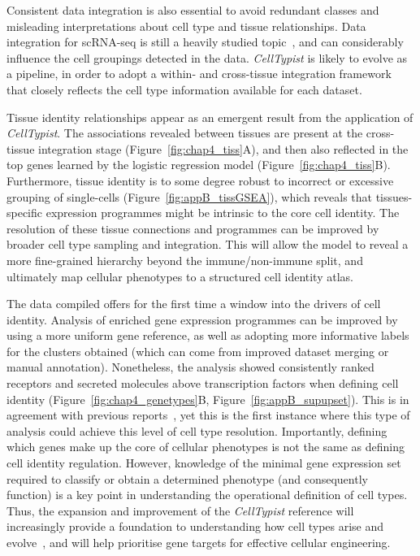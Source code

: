 Consistent data integration is also essential to avoid redundant classes and misleading interpretations about cell type and tissue relationships. Data integration for scRNA-seq is still a heavily studied topic~\citep{haghverdi_batch_2018,lopez_deep_2018,polanski_bbknn:_2019, stuart_comprehensive_2019}, and can considerably influence the cell groupings detected in the data. \textit{CellTypist} is likely to evolve as a pipeline, in order to adopt a within- and cross-tissue integration framework that closely reflects the cell type information available for each dataset.

Tissue identity relationships appear as an emergent result from the application of \textit{CellTypist}. The associations revealed between tissues are present at the cross-tissue integration stage (Figure~\ref{fig:chap4_tiss}A), and then also reflected in the top genes learned by the logistic regression model (Figure~\ref{fig:chap4_tiss}B). Furthermore, tissue identity is to some degree robust to incorrect or excessive grouping of single-cells (Figure~\ref{fig:appB_tissGSEA}), which reveals that tissues-specific expression programmes might be intrinsic to the core cell identity. The resolution of these tissue connections and programmes can be improved by broader cell type sampling and integration. This will allow the model to reveal a more fine-grained hierarchy beyond the immune/non-immune split, and ultimately map cellular phenotypes to a structured cell identity atlas.

The data compiled offers for the first time a window into the drivers of cell identity. Analysis of enriched gene expression programmes can be improved by using a more uniform gene reference, as well as adopting more informative labels for the clusters obtained (which can come from improved dataset merging or manual annotation). Nonetheless, the analysis showed consistently ranked receptors and secreted molecules above transcription factors when defining cell identity (Figure~\ref{fig:chap4_genetypes}B, Figure~\ref{fig:appB_supupset}). This is in agreement with previous reports~\citep{sonawane_understanding_2017}, yet this is the first instance where this type of analysis could achieve this level of cell type resolution. Importantly, defining which genes make up the core of cellular phenotypes is not the same as defining cell identity regulation. However, knowledge of the minimal gene expression set required to classify or obtain a determined phenotype (and consequently function) is a key point in understanding the operational definition of cell types. Thus, the expansion and improvement of the \textit{CellTypist} reference will increasingly provide a foundation to understanding how cell types arise and evolve~\citep{zimmermann_ancient_2019}, and will help prioritise gene targets for effective cellular engineering.


